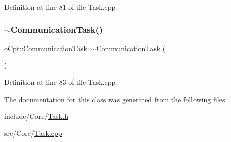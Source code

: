 Definition at line 81 of file Task.\+cpp.

\hypertarget{classo_cpt_1_1_communication_task_a046da901df467610f94dbe0a8e3add00}{}\label{classo_cpt_1_1_communication_task_a046da901df467610f94dbe0a8e3add00} 
\subsubsection{\texorpdfstring{$\sim$\+Communication\+Task()}{~CommunicationTask()}}
{\footnotesize\ttfamily o\+Cpt\+::\+Communication\+Task\+::$\sim$\+Communication\+Task (\begin{DoxyParamCaption}{ }\end{DoxyParamCaption})\hspace{0.3cm}{\ttfamily [virtual]}}



Definition at line 83 of file Task.\+cpp.



The documentation for this class was generated from the following files\+:\begin{DoxyCompactItemize}
\item 
include/\+Core/\hyperlink{_task_8h}{Task.\+h}\item 
src/\+Core/\hyperlink{_task_8cpp}{Task.\+cpp}\end{DoxyCompactItemize}
